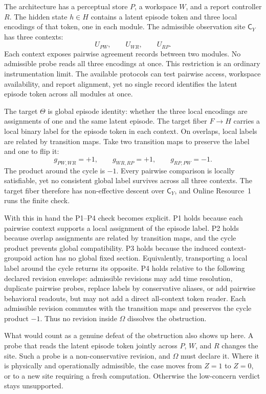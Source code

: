 \documentclass[11pt]{article}
\begin{document}
The architecture has a perceptual store $P$, a workspace $W$, and a report
controller $R$.
The hidden state $h \in H$ contains a latent episode token and three local
encodings of that token, one in each module.
The admissible observation site $\mathsf{C}_Y$ has three contexts:
\[
U_{PW},\qquad U_{WR},\qquad U_{RP}.
\]
Each context exposes pairwise agreement records between two modules.
No admissible probe reads all three encodings at once.
This restriction is an ordinary instrumentation limit. The available protocols
can test pairwise access, workspace availability, and report alignment, yet no
single record identifies the latent episode token across all modules at once.

The target $\Theta$ is global episode identity: whether the three local
encodings are assignments of one and the same latent episode.
The target fiber $F \to H$ carries a local binary label for the episode token
in each context.
On overlaps, local labels are related by transition maps.
Take two transition maps to preserve the label and one to flip it:
\[
g_{PW,WR} = +1,\qquad
g_{WR,RP} = +1,\qquad
g_{RP,PW} = -1.
\]
The product around the cycle is $-1$. Every pairwise comparison is locally
satisfiable, yet no consistent global label survives across all three contexts.
The target fiber therefore has non-effective descent over $\mathsf{C}_Y$, and
Online Resource~1 runs the finite check.

With this in hand the P1--P4 check becomes explicit. P1 holds because each
pairwise context supports a local assignment of the episode label.
P2 holds because overlap assignments are related by transition maps, and the
cycle product prevents global compatibility.
P3 holds because the induced context-groupoid action has no global fixed
section.
Equivalently, transporting a local label around the cycle returns its
opposite.
P4 holds relative to the following declared revision envelope:
admissible revisions may add time resolution, duplicate pairwise probes,
replace labels by conservative aliases, or add pairwise behavioral readouts,
but may not add a direct all-context token reader.
Each admissible revision commutes with the transition maps and preserves the
cycle product $-1$.
Thus no revision inside $\Omega$ dissolves the obstruction.

What would count as a genuine defeat of the obstruction also shows up here. A
probe that reads the latent episode token jointly across $P$, $W$, and $R$
changes the site. Such a probe is a non-conservative revision, and $\Omega$ must
declare it. Where it is physically and operationally admissible, the case moves
from $Z = 1$ to $Z = 0$, or to a new site requiring a fresh computation.
Otherwise the low-concern verdict stays unsupported.
\end{document}
